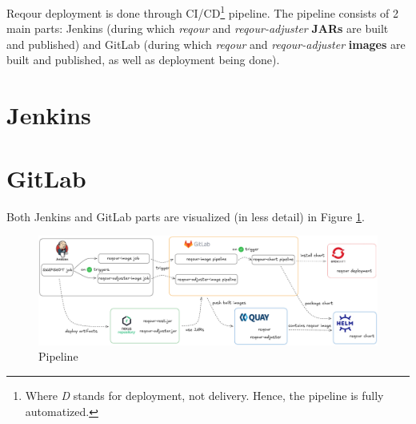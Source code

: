 \documentclass[../main.tex]{subfiles}
\begin{document}






Reqour deployment is done through CI/CD\footnote{Where \textit{D} stands for deployment, not delivery. Hence, the pipeline is fully automatized.} pipeline. The pipeline consists of 2 main parts: Jenkins (during which \textit{reqour} and \textit{reqour-adjuster} \textbf{JARs} are built and published) and GitLab (during which \textit{reqour} and \textit{reqour-adjuster} \textbf{images} are built and published, as well as deployment being done).

\section{Jenkins}


\section{GitLab}


Both Jenkins and GitLab parts are visualized (in less detail) in Figure \ref{fig:pipeline}.

\begin{figure}
  \begin{center}
    \includegraphics[width=\textwidth]{images/pipeline.png}
  \end{center}
  \caption{Pipeline}
  \label{fig:pipeline}
\end{figure}
\end{document}
